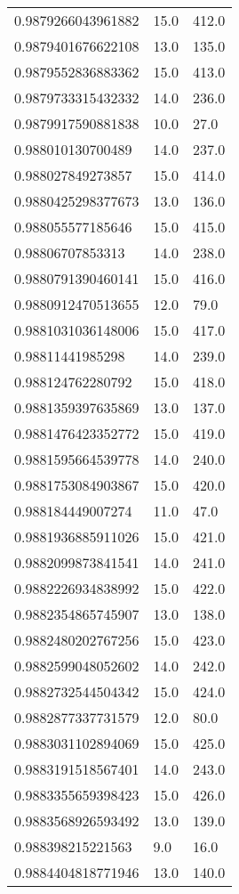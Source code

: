 \begin{center}
\begin{supertabular}[H]{p{0.30\textwidth}p{0.05\textwidth}p{0.05\textwidth}}
0.9879266043961882 & 15.0 & 412.0 \\ 
0.9879401676622108 & 13.0 & 135.0 \\ 
0.9879552836883362 & 15.0 & 413.0 \\ 
0.9879733315432332 & 14.0 & 236.0 \\ 
0.9879917590881838 & 10.0 & 27.0 \\ 
0.988010130700489 & 14.0 & 237.0 \\ 
0.988027849273857 & 15.0 & 414.0 \\ 
0.9880425298377673 & 13.0 & 136.0 \\ 
0.988055577185646 & 15.0 & 415.0 \\ 
0.98806707853313 & 14.0 & 238.0 \\ 
0.9880791390460141 & 15.0 & 416.0 \\ 
0.9880912470513655 & 12.0 & 79.0 \\ 
0.9881031036148006 & 15.0 & 417.0 \\ 
0.98811441985298 & 14.0 & 239.0 \\ 
0.988124762280792 & 15.0 & 418.0 \\ 
0.9881359397635869 & 13.0 & 137.0 \\ 
0.9881476423352772 & 15.0 & 419.0 \\ 
0.9881595664539778 & 14.0 & 240.0 \\ 
0.9881753084903867 & 15.0 & 420.0 \\ 
0.988184449007274 & 11.0 & 47.0 \\ 
0.9881936885911026 & 15.0 & 421.0 \\ 
0.9882099873841541 & 14.0 & 241.0 \\ 
0.9882226934838992 & 15.0 & 422.0 \\ 
0.9882354865745907 & 13.0 & 138.0 \\ 
0.9882480202767256 & 15.0 & 423.0 \\ 
0.9882599048052602 & 14.0 & 242.0 \\ 
0.9882732544504342 & 15.0 & 424.0 \\ 
0.9882877337731579 & 12.0 & 80.0 \\ 
0.9883031102894069 & 15.0 & 425.0 \\ 
0.9883191518567401 & 14.0 & 243.0 \\ 
0.9883355659398423 & 15.0 & 426.0 \\ 
0.9883568926593492 & 13.0 & 139.0 \\ 
0.988398215221563 & 9.0 & 16.0 \\ 
0.9884404818771946 & 13.0 & 140.0 \\ 

\end{supertabular}
\end{center}

